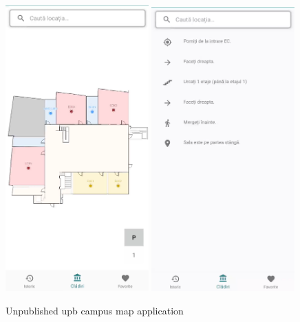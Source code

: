     \begin{figure}[!ht]
        \centering
        \begin{minipage}[b]{\textwidth}
            \captionsetup{justification=centering}
             \includegraphics[width=0.49\textwidth]{figures/navigation_apps/upb_campus_unpublished1.png}
             \includegraphics[width=0.49\textwidth]{figures/navigation_apps/upb_campus_unpublished2.png}
            \caption{Unpublished \acrshort{upb} campus map application}
            \label{2:fig:upb_campus_unpublished}
        \end{minipage}
    \end{figure}
    
